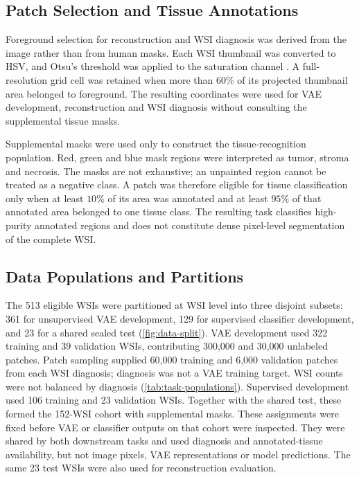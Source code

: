 \documentclass[conference,a4paper]{IEEEtran}
\begin{document}
\subsection{Patch Selection and Tissue Annotations}

Foreground selection for reconstruction and WSI diagnosis was derived from
the image rather than from human masks. Each WSI thumbnail was
converted to HSV, and Otsu's threshold was applied to the saturation channel
\cite{otsu_threshold_1979}. A full-resolution grid cell was retained when more
than $60\%$ of its projected thumbnail area belonged to foreground. The resulting coordinates were used for VAE development, reconstruction and
WSI diagnosis without consulting the supplemental tissue masks.

Supplemental masks were used only to construct the tissue-recognition
population. Red, green and blue mask regions were interpreted as tumor,
stroma and necrosis. The masks are not exhaustive; an unpainted region cannot
be treated as a negative class. A patch was therefore eligible for tissue
classification only when at least $10\%$ of its area was annotated and at least
$95\%$ of that annotated area belonged to one tissue class. The resulting task
classifies high-purity annotated regions and does not constitute dense
pixel-level segmentation of the complete WSI.

\subsection{Data Populations and Partitions}

The 513 eligible WSIs were partitioned at WSI level into three disjoint
subsets: 361 for unsupervised VAE development, 129 for supervised classifier
development, and 23 for a shared sealed test (\autoref{fig:data-split}). VAE
development used 322 training and 39 validation WSIs, contributing 300,000 and
30,000 unlabeled patches. Patch sampling supplied 60,000 training and 6,000
validation patches from each WSI diagnosis; diagnosis was not a VAE training
target. WSI counts were not balanced by diagnosis
(\autoref{tab:task-populations}). Supervised development used 106 training and
23 validation WSIs. Together with the shared test, these formed the 152-WSI
cohort with supplemental masks. These assignments were fixed before VAE or
classifier outputs on that cohort were inspected. They were shared by both
downstream tasks and used diagnosis and annotated-tissue availability, but
not image pixels, VAE representations or model predictions. The same 23 test
WSIs were also used for reconstruction evaluation.
\end{document}
